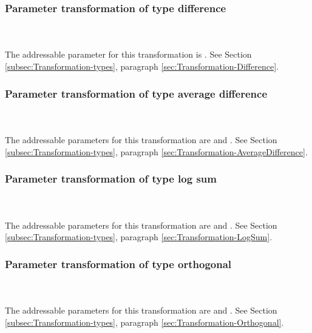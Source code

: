 \subsubsection{Parameter transformation of type difference}
\label{syntax:Transformation-Difference} \\~\\
The addressable parameter for this transformation is . See Section \ref{subsec:Transformation-types}, paragraph \ref{sec:Transformation-Difference}.

\subsubsection{Parameter transformation of type average difference}
\label{syntax:Transformation-AverageDifference} \\~\\
The addressable parameters for this transformation are  and . See Section \ref{subsec:Transformation-types}, paragraph \ref{sec:Transformation-AverageDifference}.

\subsubsection{Parameter transformation of type log sum}
\label{syntax:Transformation-LogSum} \\~\\
The addressable parameters for this transformation are  and . See Section \ref{subsec:Transformation-types}, paragraph \ref{sec:Transformation-LogSum}.

\subsubsection{Parameter transformation of type orthogonal}
\label{syntax:Transformation-Orthogonal} \\~\\
The addressable parameters for this transformation are  and . See Section \ref{subsec:Transformation-types}, paragraph \ref{sec:Transformation-Orthogonal}.

